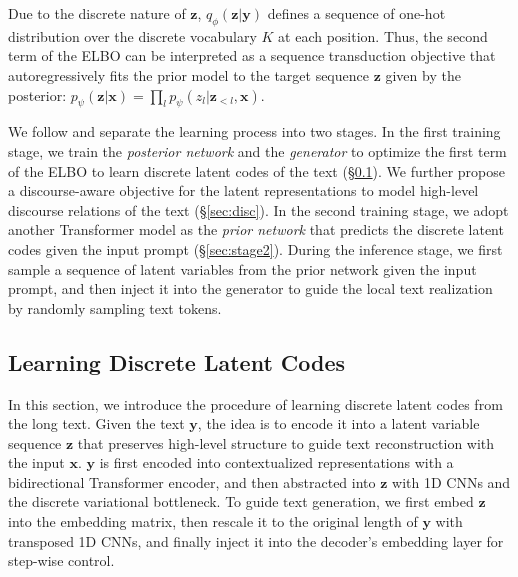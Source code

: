 \documentclass[11pt]{article}
\begin{document}
Due to the discrete nature of $\boldsymbol{z}$, $q_\phi(\boldsymbol{z}|\boldsymbol{y})$ defines a sequence of one-hot distribution over the discrete vocabulary $K$ at each position. Thus, the second term of the ELBO can be interpreted as a sequence transduction objective that autoregressively fits the prior model to the target sequence $\boldsymbol{z}$ given by the posterior: $p_\psi(\boldsymbol{z}|\boldsymbol{x})=\prod_l p_\psi(z_l|\boldsymbol{z}_{<l},\boldsymbol{x})$. %

We follow \citet{DBLP:conf/nips/OordVK17} and separate the learning process into two stages. In the first training stage, we train the \textit{posterior network} and the \textit{generator} to optimize the first term of the ELBO to learn discrete latent codes of the text (\S{\ref{sec:stage1}}). We further propose a discourse-aware objective for the latent representations to model high-level discourse relations of the text (\S{\ref{sec:disc}}). In the second training stage, we adopt another Transformer model as the \textit{prior network} that predicts the discrete latent codes given the input prompt (\S{\ref{sec:stage2}}). During the inference stage, we first sample a sequence of latent variables from the prior network given the input prompt, and then inject it into the generator to guide the local text realization by randomly sampling text tokens.



\subsection{Learning Discrete Latent Codes}\label{sec:stage1}

In this section, we introduce the procedure of learning discrete latent codes from the long text. Given the text $\boldsymbol{y}$, the idea is to encode it into a latent variable sequence $\boldsymbol{z}$ that preserves high-level structure to guide text reconstruction with the input $\boldsymbol{x}$. $\boldsymbol{y}$ is first encoded into contextualized representations with a bidirectional Transformer encoder, and then abstracted into $\boldsymbol{z}$ with 1D CNNs and the discrete variational bottleneck. To guide text generation, we first embed $\boldsymbol{z}$ into the embedding matrix, then rescale it to the original length of $\boldsymbol{y}$ with transposed 1D CNNs, and finally inject it into the decoder's embedding layer for step-wise control.
\end{document}
